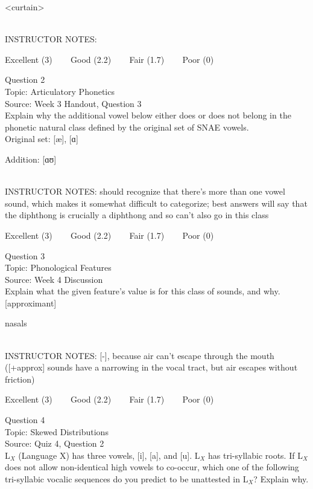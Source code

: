 \documentclass[12pt]{article}
\begin{document}
<curtain>


~\\
INSTRUCTOR NOTES: 


\vfill
Excellent (3) ~~~ Good (2.2) ~~~ Fair (1.7) ~~~ Poor (0)
\newpage

{\large Question 2}\\

Topic: Articulatory Phonetics\\
Source: Week 3 Handout, Question 3\\

Explain why the additional vowel below either does or does not belong in the phonetic natural class defined by the original set of SNAE vowels.\\

Original set: {[æ]}, {[ɑ]}

Addition: {[ɑʊ]}


~\\
INSTRUCTOR NOTES: should recognize that there's more than one vowel sound, which makes it somewhat difficult to categorize; best answers will say that the diphthong is crucially a diphthong and so can't also go in this class


\vfill
Excellent (3) ~~~ Good (2.2) ~~~ Fair (1.7) ~~~ Poor (0)
\newpage

{\large Question 3}\\

Topic: Phonological Features\\
Source: Week 4 Discussion\\

Explain what the given feature’s value is for this class of sounds, and why.\\

{[approximant]}

nasals


~\\
INSTRUCTOR NOTES: [-], because air can't escape through the mouth ([+approx] sounds have a narrowing in the vocal tract, but air escapes without friction)


\vfill
Excellent (3) ~~~ Good (2.2) ~~~ Fair (1.7) ~~~ Poor (0)
\newpage

{\large Question 4}\\

Topic: Skewed Distributions\\
Source: Quiz 4, Question 2\\

L$_X$ (Language X) has three vowels, [i], [a], and [u]. L$_X$ has tri-syllabic roots. If L$_X$ does not allow non-identical high vowels to co-occur, which one of the following tri-syllabic vocalic sequences do you predict to be unattested in L$_X$? Explain why.\\
\end{document}
